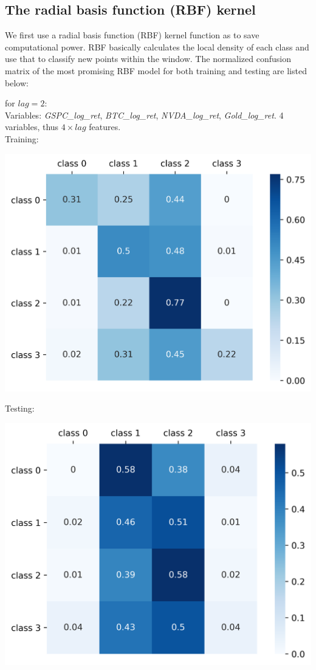 \documentclass[9pt,twocolumn,twoside]{ilcss}
\begin{document}
\subsection*{The radial basis function (RBF) kernel}
We first use a radial basis function (RBF) kernel function as to save computational power. RBF basically calculates the local density of each class and use that to classify new points within the window. The normalized confusion matrix of the most promising RBF model for both training and testing are listed below:

\noindent  for $lag = 2$:
\smallskip\\
Variables: \textit{GSPC\_log\_ret}, \textit{BTC\_log\_ret}, \textit{NVDA\_log\_ret}, \textit{Gold\_log\_ret}. 4 variables, thus $4\times lag$ features.
\smallskip\\
Training:

\begin{center}
\includegraphics[scale=0.35]{train_cfs_mat_2_rbf.png}
\end{center}
Testing:

\begin{center}
\includegraphics[scale=0.35]{test_cfs_mat_2_rbf.png}
\end{center}
\end{document}
